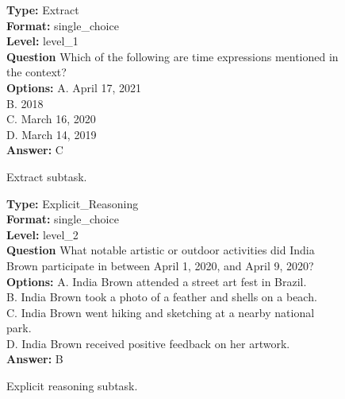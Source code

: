 \documentclass{article} %
\begin{document}
\begin{figure}[htbp]
\begin{tcolorbox}[
colframe=black!75!white, 
colback=white, sharp corners, 
boxrule=0.8pt, width=\textwidth,
title=Extract
] 
\textbf{Type:} Extract \\
\textbf{Format:} single\_choice \\
\textbf{Level:} level\_1 \\
\textbf{Question} Which of the following are time expressions mentioned in the context? \\
\textbf{Options:} A. April 17, 2021 \\
B. 2018 \\
C. March 16, 2020 \\
D. March 14, 2019 \\
\textbf{Answer:} C
\end{tcolorbox} 
\caption{Extract subtask.}
\label{fig:extract}
\end{figure}

\begin{figure}[htbp]
\begin{tcolorbox}[
colframe=black!75!white, 
colback=white, sharp corners, 
boxrule=0.8pt, width=\textwidth,
title=Explicit Reasoning
] 
\textbf{Type:} Explicit\_Reasoning \\
\textbf{Format:} single\_choice \\
\textbf{Level:} level\_2 \\
\textbf{Question} What notable artistic or outdoor activities did India Brown participate in between April 1, 2020, and April 9, 2020? \\
\textbf{Options:} A. India Brown attended a street art fest in Brazil. \\
B. India Brown took a photo of a feather and shells on a beach. \\
C. India Brown went hiking and sketching at a nearby national park. \\
D. India Brown received positive feedback on her artwork. \\
\textbf{Answer:} B
\end{tcolorbox} 
\caption{Explicit reasoning subtask.}
\label{fig:explicit_reasoning}
\end{figure}
\end{document}
